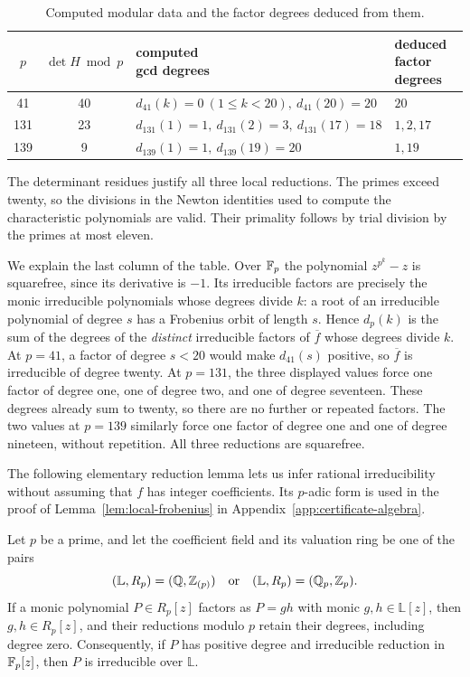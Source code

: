 \begin{table}[htbp]
\centering
\caption{Computed modular data and the factor degrees deduced from them.}
\label{tab:modular-certificate}
\begin{tabular}{@{}ccll@{}}
\toprule
$p$ & $\det H\bmod p$ & \shortstack{computed\\gcd degrees} &
\shortstack{deduced\\factor degrees}\\
\midrule
41 & 40 & $d_{41}(k)=0\ (1\leq k<20),\ d_{41}(20)=20$ & $20$\\
131 & 23 & $d_{131}(1)=1,\ d_{131}(2)=3,\ d_{131}(17)=18$ & $1,2,17$\\
139 & 9 & $d_{139}(1)=1,\ d_{139}(19)=20$ & $1,19$\\
\bottomrule
\end{tabular}
\end{table}

The determinant residues justify all three local reductions.  The primes
exceed twenty, so the divisions in the Newton identities used to compute
the characteristic polynomials are valid.  Their primality follows by
trial division by the primes at most eleven.

We explain the last column of the table.  Over $\mathbb F_p$ the polynomial
$z^{p^k}-z$ is squarefree, since its derivative is $-1$.  Its irreducible
factors are precisely the monic irreducible polynomials whose degrees
divide $k$: a root of an irreducible polynomial of degree $s$ has a
Frobenius orbit of length $s$.  Hence $d_p(k)$ is the sum of the degrees of
the \emph{distinct} irreducible factors of $\overline f$ whose degrees
divide $k$.  At $p=41$, a factor of degree $s<20$ would make $d_{41}(s)$
positive, so $\overline f$ is irreducible of degree twenty.  At $p=131$,
the three displayed values force one factor of degree one, one of degree
two, and one of degree seventeen.  These degrees already sum to twenty,
so there are no further or repeated factors.  The two values at $p=139$
similarly force one factor of degree one and one of degree nineteen,
without repetition.  All three reductions are squarefree.

The following elementary reduction lemma lets us infer rational
irreducibility without assuming that $f$ has integer coefficients.
Its $p$-adic form is used in the proof of Lemma~\ref{lem:local-frobenius}
in Appendix~\ref{app:certificate-algebra}.

\begin{lemma}\label{lem:monic-local-reduction}
Let $p$ be a prime, and let the coefficient field and its valuation ring be
one of the pairs
\[
 (\mathbb L,R_p)=(\mathbb Q,\mathbb Z_{(p)})
 \quad\text{or}\quad
 (\mathbb L,R_p)=(\mathbb Q_p,\mathbb Z_p).
\]
If a monic polynomial $P\in R_p[z]$ factors as $P=gh$ with monic
$g,h\in\mathbb L[z]$, then $g,h\in R_p[z]$, and their reductions modulo
$p$ retain their degrees, including degree zero.  Consequently, if $P$
has positive degree and irreducible reduction in $\mathbb F_p[z]$, then $P$ is
irreducible over $\mathbb L$.
\end{lemma}

